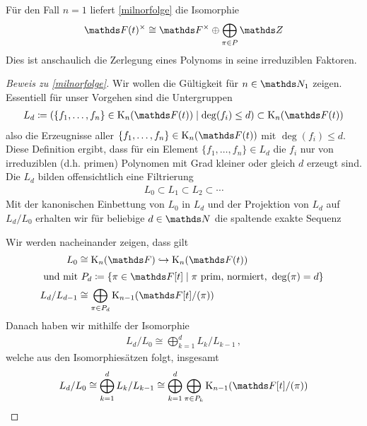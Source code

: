 \documentclass[ngerman,fontsize=11pt, paper=a4, parskip=half, titlepage=true, toc=bib]{scrartcl}
\begin{document}
\begin{Bem}
  Für den Fall $n=1$ liefert \ref{milnorfolge} die Isomorphie
  \begin{gather*}
    \Ft^\times
    \cong \Fx
    \oplus\bigoplus_{\pi\in P}\Z
    \end{gather*}
    Dies ist anschaulich die Zerlegung eines
    Polynoms in seine irreduziblen Faktoren.
\end{Bem}
\begin{proof}[Beweis zu \ref{milnorfolge}]
  Wir wollen die Gültigkeit für $n\in\N_1$ zeigen.
  Essentiell für unser Vorgehen sind die Untergruppen
  \begin{gather*}
    L_d\coloneqq \left(
      \{f_1,\dotsc,f_n\}\in\KnFt \mid \deg(f_i)\leq d
      \right)
    \subset\KnFt
  \end{gather*}
  also die Erzeugnisse aller $\{f_1,\dotsc,f_n\}\in\KnFt$ mit
  $\deg(f_i)\leq d$. Diese Definition ergibt, dass für ein 
  Element $\{f_1,\dotsc,f_n\}\in L_d$ die $f_i$ nur von 
  irreduziblen (d.h. primen) Polynomen mit
  Grad kleiner oder gleich $d$ erzeugt sind.
  Die $L_d$ bilden offensichtlich eine Filtrierung
  \begin{gather*}
    L_0\subset L_1\subset L_2\subset \dotsb
  \end{gather*}
  Mit der kanonischen Einbettung von $L_0$ in $L_d$ und der Projektion
  von $L_d$ auf $L_d/L_0$ erhalten wir für
  beliebige $d\in\N$ die spaltende exakte Sequenz
  \begin{center}
  \end{center}
  Wir werden nacheinander zeigen, dass gilt
  \begin{align}
    L_0&\cong \KnF\hookrightarrow \KnFt  \label{1}\\
    \intertext{
    und mit $P_d\coloneqq \left\{
    \pi\in \F[t]\mid \pi\text{ prim, normiert, }\deg(\pi)=d
    \right\}$
    }
    L_d/L_{d-1}&\cong \bigoplus_{\pi\in P_d} \K_{n-1}(\Ftpi)\label{2}
  \end{align}
  Danach haben wir mithilfe der Isomorphie
  \begin{gather} \label{3}
    L_d/L_0\cong \bigoplus_{k=1}^d L_k/L_{k-1} \,,
  \end{gather}
  welche aus den Isomorphiesätzen folgt, insgesamt
  \begin{align}\label{4}
    L_d/L_0
    \cong \bigoplus_{k=1}^d L_k/L_{k-1}
    \cong \bigoplus_{k=1}^d\bigoplus_{\pi\in P_k} \K_{n-1}(\Ftpi)

\end{align}
\end{proof}
\end{document}
